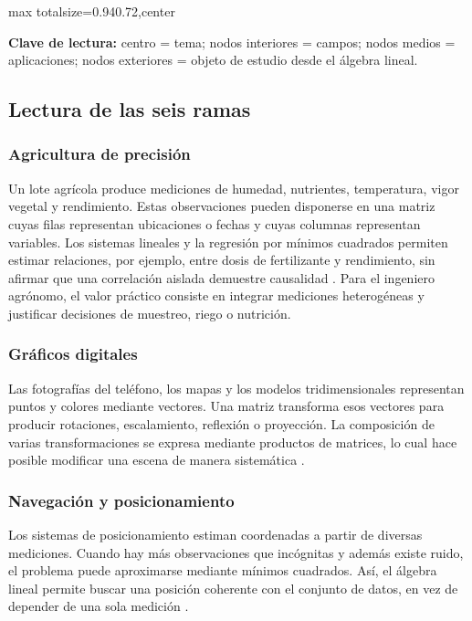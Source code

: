 \documentclass[spanish,letterpaper,oneside]{article}
\begin{document}
\begin{landscape}
\begin{center}
\begin{adjustbox}{max totalsize={0.94\linewidth}{0.72\textheight},center}
\end{adjustbox}
\vspace{0.1cm}

\footnotesize
\textbf{Clave de lectura:} centro = tema; nodos interiores = campos; nodos medios = aplicaciones; nodos exteriores = objeto de estudio desde el álgebra lineal.
\end{center}
\end{landscape}

\subsection{Lectura de las seis ramas}
\subsubsection{Agricultura de precisión}
Un lote agrícola produce mediciones de humedad, nutrientes, temperatura, vigor vegetal y rendimiento. Estas observaciones pueden disponerse en una matriz cuyas filas representan ubicaciones o fechas y cuyas columnas representan variables. Los sistemas lineales y la regresión por mínimos cuadrados permiten estimar relaciones, por ejemplo, entre dosis de fertilizante y rendimiento, sin afirmar que una correlación aislada demuestre causalidad \citep{montgomery2021introduction}. Para el ingeniero agrónomo, el valor práctico consiste en integrar mediciones heterogéneas y justificar decisiones de muestreo, riego o nutrición.

\subsubsection{Gráficos digitales}
Las fotografías del teléfono, los mapas y los modelos tridimensionales representan puntos y colores mediante vectores. Una matriz transforma esos vectores para producir rotaciones, escalamiento, reflexión o proyección. La composición de varias transformaciones se expresa mediante productos de matrices, lo cual hace posible modificar una escena de manera sistemática \citep{gonzalez2018digital}.

\subsubsection{Navegación y posicionamiento}
Los sistemas de posicionamiento estiman coordenadas a partir de diversas mediciones. Cuando hay más observaciones que incógnitas y además existe ruido, el problema puede aproximarse mediante mínimos cuadrados. Así, el álgebra lineal permite buscar una posición coherente con el conjunto de datos, en vez de depender de una sola medición \citep{strang2023introduction}.
\end{document}
